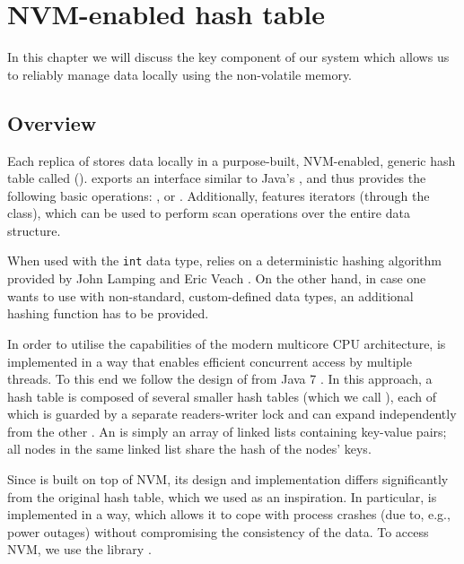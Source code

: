 \chapter{NVM-enabled hash table} \label{OwnWork}
In this chapter we will discuss the key component of our system which allows us to reliably manage data locally using the non-volatile memory. 

\section{Overview}

    Each replica of \DHTS stores data locally in a purpose-built, NVM-enabled, generic hash table called \emph{\PersistentHashTable} (\PHT). \PHT exports an interface similar to Java's \HashMap \cite{HashMapJava}, and thus provides the following basic operations: \insertMethod, \getMethod or \removeMethod. Additionally, \PHT features iterators (through the \Iterator class), which can be used to perform scan operations over the entire data structure.
    
    When used with the \texttt{int} data type, \PHT relies on a deterministic hashing algorithm provided by John Lamping and Eric Veach \cite{Hashing}. On the other hand, in case one wants to use \PHT with non-standard, custom-defined data types, an additional hashing function has to be provided.
    
    In order to utilise the capabilities of the modern multicore CPU architecture, \PHT is implemented in a way that enables efficient concurrent access by multiple threads. 
    To this end we follow the design of \ConcurrentHashMap from Java 7 \cite{ConcurrentHashMapJava}. 
    In this approach, a hash table is composed of several smaller hash tables (which we call \internalHashMaps), each of which is guarded by a separate readers-writer lock and can expand independently from the other \internalHashMaps. 
    An \internalHashMap is simply an array of linked lists containing key-value pairs; all nodes in the same linked list share the hash of the nodes' keys.
    
    Since \PHT is built on top of NVM, its design and implementation differs significantly from the original hash table, which we used as an inspiration. 
    In particular, \PHT is implemented in a way, which allows it to cope with process crashes (due to, e.g., power outages) without compromising the consistency of the data. 
    To access NVM, we use the \libpmemobj library \cite{Libpmemobj}.
    
